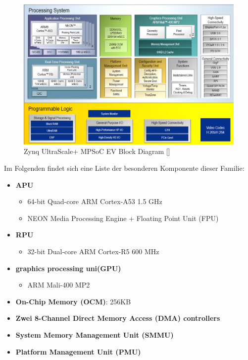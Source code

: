 \begin{figure}[h]
	\begin{center}
		\includegraphics[width=1\textwidth]{./images/zynqmp-blockdiagramm.jpg}
	\end{center}
	\vspace{-5pt}
	\caption[Zynq UltraScale+ MPSoC EV Block Diagram]{Zynq UltraScale+ MPSoC EV Block Diagram [\cite{XilinxInc.}]} %
	\label{fig:zynqmp:block:diagram}
	\vspace{-5pt}
\end{figure}

 Im Folgenden findet sich eine Liste der besonderen Komponente dieser Familie:
 \begin{itemize}
 	\item \textbf{APU}
 	\begin{itemize}
 		\item 64-bit Quad-core ARM Cortex-A53 1.5 GHz
 		\item NEON Media Processing Engine + Floating Point Unit (FPU)
 	\end{itemize}
 	\item \textbf{RPU}
 	\begin{itemize}
 		\item 32-bit Dual-core ARM Cortex-R5  600 MHz
 	\end{itemize}
 	\item \textbf{graphics processing uni(GPU)}
 	\begin{itemize}
 		\item ARM Mali-400 MP2
 	\end{itemize}
 	\item \textbf{On-Chip Memory (OCM)}: 256KB
 	\item \textbf{Zwei 8-Channel Direct Memory Access (DMA) controllers}
 	\item \textbf{System Memory Management Unit (SMMU)}
 	\item \textbf{Platform Management Unit (PMU)}
 \end{itemize}
 
